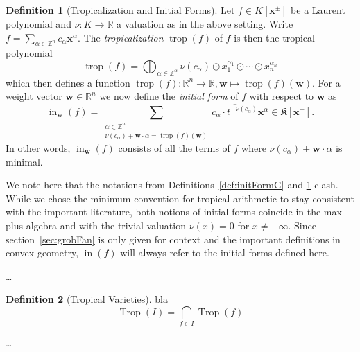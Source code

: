 \documentclass[
  paper=a4,
  DIV=14,
  fontsize=12pt,
  titlepage,
  bibliography=totoc,
  listof=totoc,
  pagesize=pdftex
]{scrartcl}
\numberwithin{figure}{section}
\numberwithin{equation}{section}
\numberwithin{table}{section}
\newcommand*\setZ{\mathds{Z}}
\newcommand*\setR{\mathds{R}}
\let\vec\mathbf
\DeclareMathOperator{\Trop}{Trop}
\DeclareMathOperator{\trop}{trop}
\DeclareMathOperator{\initial}{in}
\theoremstyle{definition}
\newtheorem{definition}{Definition}
\numberwithin{definition}{section}
\begin{document}
\begin{definition}[Tropicalization and Initial Forms]
  Let $f \in K[\vec x^\pm]$ be a Laurent polynomial and $\nu : K \to \setR$ a valuation as
  in the above setting. Write $f = \sum_{\alpha \in \setZ^n} c_\alpha \vec x^\alpha$. The
  \emph{tropicalization} $\trop(f)$ of $f$ is then the tropical polynomial
  \[
    \trop(f) = \bigoplus_{\alpha\in\setZ^\alpha} \nu(c_\alpha)
    \odot x_1^{\alpha_1}\odot\cdots \odot x_n^{\alpha_n}
  \]
  which then defines a function $\trop(f) : \setR^n \to \setR, \vec w \mapsto
  \trop(f)(\vec w)$. For a weight vector $\vec w \in \setR^n$ we now define the
  \emph{initial form} of $f$ with respect to $\vec w$ as
  \[
    \initial_{\vec w}(f) =
    \sum_{ \substack{
        \alpha \in \setZ^n \\
        \nu(c_\alpha) + \vec w\cdot \alpha = \trop(f)(\vec w)
    }} \overline {c_\alpha \cdot t^{-\nu(c_\alpha)} } \vec x^\alpha
    \in \mathfrak K[\vec x^\pm].
  \]
  In other words, $\initial_{\vec w}(f)$ consists of all the terms of $f$ where
  $\nu(c_\alpha)+\vec w\cdot \alpha$ is minimal.
  \label{def:initialId}
\end{definition}

We note here that the notations from Definitions~\ref{def:initFormG} and
\ref{def:initialId} clash. While we chose the minimum-convention for tropical arithmetic
to stay consistent with the important literature, both notions of initial forms coincide
in the max-plus algebra and with the trivial valuation $\nu(x) = 0$ for $x\neq-\infty$.
Since section~\ref{sec:grobFan} is only given for context and the important definitions in
convex geometry, $\initial(f)$ will always refer to the initial forms defined here.

\dots %

\begin{definition}[Tropical Varieties]
  bla %
  \[
    \Trop(I) = \bigcap_{f \in I} \Trop(f)
  \]
  \label{def:tropicalVariety}
\end{definition}

\dots %
\end{document}
